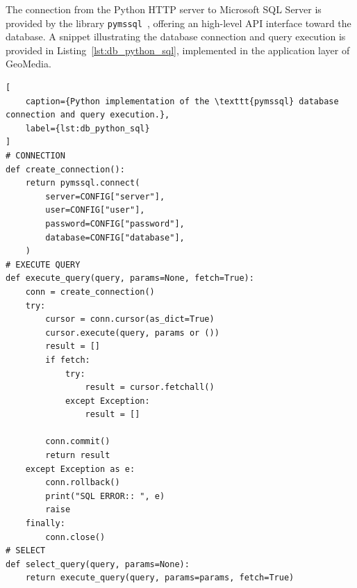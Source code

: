 The connection from the Python HTTP server to Microsoft SQL Server is provided by the library \texttt{pymssql}~\cite{site:pymssql}, offering an high-level API interface toward the database.
A snippet illustrating the database connection and query execution is provided in Listing~\ref{lst:db_python_sql}, implemented in the application layer of GeoMedia.


\begin{lstlisting}[
    caption={Python implementation of the \texttt{pymssql} database connection and query execution.},
    label={lst:db_python_sql}
]
# CONNECTION
def create_connection():
    return pymssql.connect(
        server=CONFIG["server"],
        user=CONFIG["user"],
        password=CONFIG["password"],
        database=CONFIG["database"],
    )
# EXECUTE QUERY
def execute_query(query, params=None, fetch=True):
    conn = create_connection()
    try:
        cursor = conn.cursor(as_dict=True)
        cursor.execute(query, params or ())
        result = []
        if fetch:
            try:
                result = cursor.fetchall()
            except Exception:
                result = []

        conn.commit()
        return result
    except Exception as e:
        conn.rollback()
        print("SQL ERROR:: ", e)
        raise
    finally:
        conn.close()
# SELECT
def select_query(query, params=None):
    return execute_query(query, params=params, fetch=True)
\end{lstlisting}
